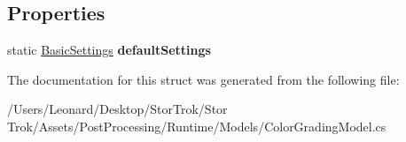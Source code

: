\subsection*{Properties}
\begin{DoxyCompactItemize}
\item 
\mbox{\label{struct_unity_engine_1_1_post_processing_1_1_color_grading_model_1_1_basic_settings_a3c6d62a952263436102ea72c64701adc}} 
static \hyperlink{struct_unity_engine_1_1_post_processing_1_1_color_grading_model_1_1_basic_settings}{Basic\+Settings} {\bfseries default\+Settings}
\end{DoxyCompactItemize}


The documentation for this struct was generated from the following file\+:\begin{DoxyCompactItemize}
\item 
/\+Users/\+Leonard/\+Desktop/\+Stor\+Trok/\+Stor Trok/\+Assets/\+Post\+Processing/\+Runtime/\+Models/Color\+Grading\+Model.\+cs\end{DoxyCompactItemize}
